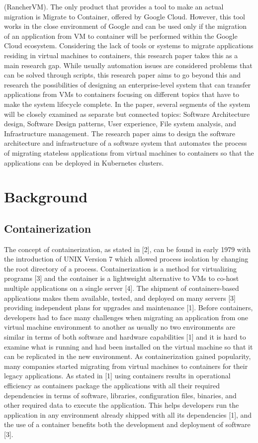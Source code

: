 \documentclass{article}
\begin{document}
\begin{multicols}{2}
(RancherVM). The only product that provides a tool to make an actual migration is Migrate to Container, offered by Google Cloud. However, this tool works in the close environment of Google and can be used only if the migration of an application from VM to container will be performed within the Google Cloud ecosystem. Considering the lack of tools or systems to migrate applications residing in virtual machines to containers, this research paper takes this as a main research gap. While usually automation issues are considered problems that can be solved through scripts, this research paper aims to go beyond this and research the possibilities of designing an enterprise-level system that can transfer applications from VMs to containers focusing on different topics that have to make the system lifecycle complete. In the paper, several segments of the system will be closely examined as separate but connected topics: Software Architecture design, Software Design patterns, User experience, File system analysis, and Infrastructure management. The research paper aims to design the software architecture and infrastructure of a software system that automates the process of migrating stateless applications from virtual machines to containers so that the applications can be deployed in Kubernetes clusters.

\section{Background}

\subsection{Containerization}
The concept of containerization, as stated in [2], can be found in early 1979 with the introduction of UNIX Version 7 which allowed process isolation by changing the root directory of a process. Containerization is a method for virtualizing programs [3] and the container is a lightweight alternative to VMs to co-host multiple applications on a single server [4]. The shipment of containers-based applications makes them available, tested, and deployed on many servers [3] providing independent plans for upgrades and maintenance [1]. Before containers, developers had to face many challenges when migrating an application from one virtual machine environment to another as usually no two environments are similar in terms of both software and hardware capabilities [1] and it is hard to examine what is running and had been installed on the virtual machine so that it can be replicated in the new environment.
As containerization gained popularity, many companies started migrating from virtual machines to containers for their legacy applications. As stated in [1] using containers results in operational efficiency as containers package the applications with all their required dependencies in terms of software, libraries, configuration files, binaries, and other required data to execute the application. This helps developers run the application in any environment already shipped with all its dependencies [1], and the use of a container benefits both the development and deployment of software [3].


\end{multicols}
\end{document}
